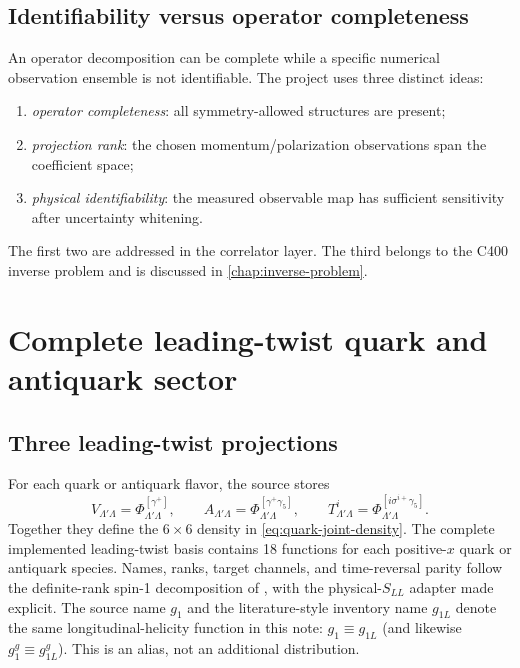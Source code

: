 \documentclass[11pt,oneside]{book}
\begin{document}
\section{Identifiability versus operator completeness}

An operator decomposition can be complete while a specific numerical observation ensemble is not identifiable.  The project uses three distinct ideas:
\begin{enumerate}
\item \emph{operator completeness}: all symmetry-allowed structures are present;
\item \emph{projection rank}: the chosen momentum/polarization observations span the coefficient space;
\item \emph{physical identifiability}: the measured observable map has sufficient sensitivity after uncertainty whitening.
\end{enumerate}
The first two are addressed in the correlator layer.  The third belongs to the C400 inverse problem and is discussed in \cref{chap:inverse-problem}.

\chapter{Complete leading-twist quark and antiquark sector}
\label{chap:quarks}

\section{Three leading-twist projections}

For each quark or antiquark flavor, the source stores
\begin{equation}
 V_{\Lambda'\Lambda}=\Phi_{\Lambda'\Lambda}^{[\gamma^+]},\qquad
 A_{\Lambda'\Lambda}=\Phi_{\Lambda'\Lambda}^{[\gamma^+\gamma_5]},\qquad
 T^i_{\Lambda'\Lambda}=\Phi_{\Lambda'\Lambda}^{[i\sigma^{i+}\gamma_5]}.
 \label{eq:VAT}
\end{equation}
Together they define the $6\times6$ density in \cref{eq:quark-joint-density}.  The complete implemented leading-twist basis contains 18 functions for each positive-$x$ quark or antiquark species.  Names, ranks, target channels, and time-reversal parity follow the definite-rank spin-1 decomposition of \textcite{VanDaal2016}, with the physical-$S_{LL}$ adapter made explicit.  The source name $g_1$ and the literature-style inventory name $g_{1L}$ denote the same longitudinal-helicity function in this note: $g_1\equiv g_{1L}$ (and likewise $g_1^g\equiv g_{1L}^g$).  This is an alias, not an additional distribution.
\end{document}
